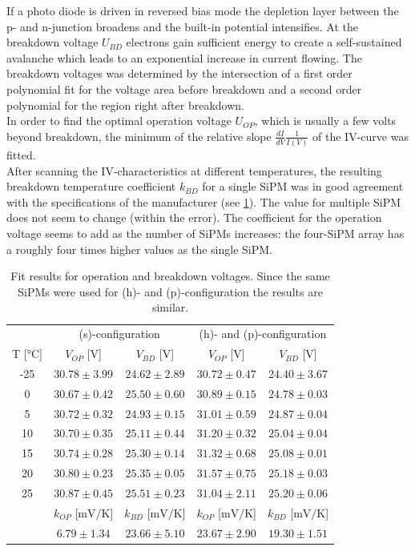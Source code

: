\documentclass[12pt]{article}
\begin{document}
If a photo diode is driven in reversed bias mode the depletion layer between the p- and n-junction broadens and the built-in potential intensifies. At the breakdown voltage $U_{BD}$ electrons gain sufficient energy to create a self-sustained avalanche which leads to an exponential increase in current flowing. The breakdown voltages was determined by the intersection of a first order polynomial fit for the voltage area before breakdown and a second order polynomial for the region right after breakdown. \\ \indent
In order to find the optimal operation voltage $U_{OP}$, which is usually a few volts beyond breakdown, the minimum of the relative slope $\frac{dI}{dV}\frac{1}{I(V)}$ of the IV-curve was fitted. \\ \indent 
After scanning the IV-characteristics at different temperatures, the resulting breakdown temperature coefficient $k_{BD}$ for a single SiPM was in good agreement with the specifications of the manufacturer \cite{SiPM_Manual} (see \ref{tab:IV_cata}). The value for multiple SiPM does not seem to change (within the error). The coefficient for the operation voltage seems to add as the number of SiPMs increases: the four-SiPM array has a roughly four times higher values as the single SiPM. \\ \indent
\begin{table}[t!]
	\centering
	\begin{tabular}{ c|cc|cc } \toprule[2pt]
		& \multicolumn{2}{c|}{(s)-configuration} & \multicolumn{2}{c}{(h)- and (p)-configuration} \\
		T [$\si{\degreeCelsius}]$ & $V_{OP}$ [$\si{\volt}$] & $V_{BD}$ [$\si{\volt}$] & $V_{OP}$ [$\si{\volt}$] & $V_{BD}$ [$\si{\volt}$]  \\ \midrule
		-25 & $30.78\pm 3.99$ & $24.62\pm 2.89$ & $30.72\pm 0.47$ & $24.40\pm 3.67$ \\
		0 & $30.67\pm 0.42$ & $25.50\pm 0.60$ & $30.89\pm 0.15$ & $24.78\pm 0.03$ \\
		5 & $30.72\pm 0.32$ & $24.93\pm 0.15$ & $31.01\pm 0.59$ & $24.87\pm 0.04$ \\
		10 & $30.70\pm 0.35$ & $25.11\pm 0.44$ & $31.20\pm 0.32$ & $25.04\pm 0.04$ \\
		15 & $30.74\pm 0.28$ & $25.30\pm 0.14$ & $31.32\pm 0.68$ & $25.08\pm 0.01$ \\
		20 & $30.80\pm 0.23$ & $25.35\pm 0.05$ & $31.57\pm 0.75$ & $25.18\pm 0.03$ \\
		25 & $30.87\pm 0.45$ & $25.51\pm 0.23$ & $31.04\pm 2.11$ & $25.20\pm 0.06$ \\
		\midrule
		& $k_{OP}$ [$\si{\milli\volt\per\kelvin}$] & $k_{BD}$ [$\si{\milli\volt\per\kelvin}$] & $k_{OP}$ [$\si{\milli\volt\per\kelvin}$] & $k_{BD}$ [$\si{\milli\volt\per\kelvin}$]  \\
		& $6.79\pm 1.34$ & $23.66\pm 5.10$ & $23.67\pm 2.90$ & $19.30\pm 1.51$ \\
		\bottomrule[2pt]
	\end{tabular}
	\caption[Fit results for operation and breakdown voltages]{Fit results for operation and breakdown voltages. Since the same SiPMs were used for (h)- and (p)-configuration the results are similar.}
	\label{tab:IV_cata}
\end{table}  
\end{document}
